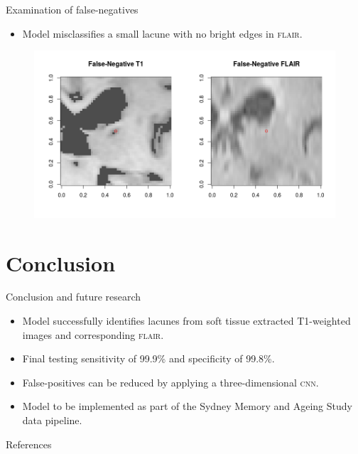 \documentclass{beamer}
\begin{document}
\begin{frame}{Examination of false-negatives}
\begin{itemize}
\item Model misclassifies a small lacune with no bright edges in \textsc{flair}.
\end{itemize}
\begin{figure}
\centering
\includegraphics[width=\linewidth]{../Thesis_Docs/Images/7_FN_t1_flair.png}
\end{figure}
\end{frame}


\section{Conclusion}

\begin{frame}{Conclusion and future research}
\begin{itemize}
\item Model successfully identifies lacunes from soft tissue extracted T1-weighted images and corresponding \textsc{flair}.
\item Final testing sensitivity of 99.9\% and specificity of 99.8\%.
\item False-positives can be reduced by applying a three-dimensional \textsc{cnn}.
\item Model to be implemented as part of the Sydney Memory and Ageing Study data pipeline.
\end{itemize}

\end{frame}


\begin{frame}{References}
	
	
\end{frame}
\end{document}
